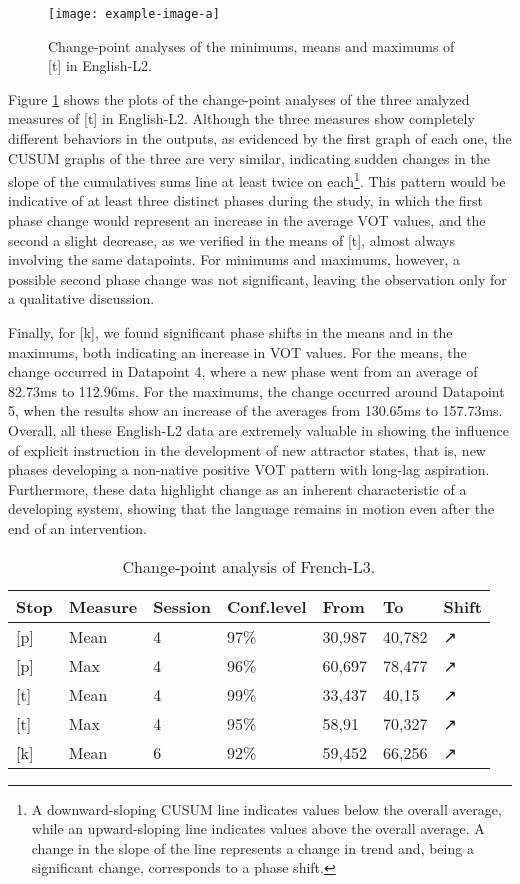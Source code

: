 \begin{figure}[h]
\centering
\texttt{[image: example-image-a]}
\caption{Change-point analyses of the minimums, means and maximums of [t] in English-L2.}
\label{laura-fig05}
\end{figure}

Figure \ref{laura-fig05} shows the plots of the change-point analyses of the
three analyzed measures of [t] in English-L2. Although the three measures show
completely different behaviors in the outputs, as evidenced by the first graph
of each one, the CUSUM graphs of the three are very similar, indicating sudden
changes in the slope of the cumulatives sums line at least twice on
each\footnote{A downward-sloping CUSUM line indicates values below the overall
average, while an upward-sloping line indicates values above the overall
average. A change in the slope of the line represents a change in trend and,
being a significant change, corresponds to a phase shift.}. This
pattern would be indicative of at least three distinct phases during the study,
in which the first phase change would represent an increase in the average VOT
values, and the second a slight decrease, as we verified in the means of [t],
almost always involving the same datapoints. For minimums and maximums,
however, a possible second phase change was not significant, leaving the
observation only for a qualitative discussion. 

Finally, for [k], we found significant phase shifts in the means and in the
maximums, both indicating an increase in VOT values. For the means, the change
occurred in Datapoint 4, where a new phase went from an average of 82.73ms to
112.96ms. For the maximums, the change occurred around Datapoint 5, when the
results show an increase of the averages from 130.65ms to 157.73ms. Overall,
all these English-L2 data are extremely valuable in showing the influence of
explicit instruction in the development of new attractor states, that is, new
phases developing a non-native positive VOT pattern with long-lag aspiration.
Furthermore, these data highlight change as an inherent characteristic of a
developing system, showing that the language remains in motion even after the
end of an intervention. 

\begin{table}[h]
\caption{Change-point analysis of French-L3.}\label{laura-table03}
\begin{tabular}{@{}lllllll@{}}
\toprule
\textbf{Stop} & \textbf{Measure} & \textbf{Session} & \textbf{Conf.level} & \textbf{From} & \textbf{To} & \textbf{Shift} \\
\midrule 
{[}p{]} & Mean & 4 & 97\% & 30,987 & 40,782 & ↗ \\
{[}p{]} & Max & 4 & 96\% & 60,697 & 78,477 & ↗ \\
{[}t{]} & Mean & 4 & 99\% & 33,437 & 40,15 & ↗ \\
{[}t{]} & Max & 4 & 95\% & 58,91 & 70,327 & ↗ \\
{[}k{]} & Mean & 6 & 92\% & 59,452 & 66,256 & ↗ \\
\bottomrule
\end{tabular}
\end{table}

